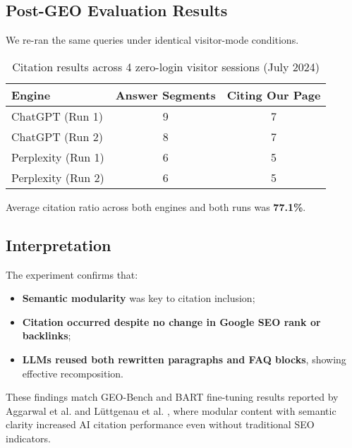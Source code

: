 \subsection{Post-GEO Evaluation Results}

We re-ran the same queries under identical visitor-mode conditions.

\begin{table}[h]
\centering
\begin{tabular}{|l|c|c|}
\hline
\textbf{Engine} & \textbf{Answer Segments} & \textbf{Citing Our Page} \\\hline
ChatGPT (Run 1) & 9 & 7 \\\hline
ChatGPT (Run 2) & 8 & 7 \\\hline
Perplexity (Run 1) & 6 & 5 \\\hline
Perplexity (Run 2) & 6 & 5 \\\hline
\end{tabular}
\caption{Citation results across 4 zero-login visitor sessions (July 2024)}
\end{table}

Average citation ratio across both engines and both runs was \textbf{77.1\%}.

\subsection{Interpretation}

The experiment confirms that:

\begin{itemize}
  \item \textbf{Semantic modularity} was key to citation inclusion;
  \item \textbf{Citation occurred despite no change in Google SEO rank or backlinks};
  \item \textbf{LLMs reused both rewritten paragraphs and FAQ blocks}, showing effective recomposition.
\end{itemize}

These findings match GEO-Bench and BART fine-tuning results reported by Aggarwal et al. \cite{aggarwal2024geo} and L\"uttgenau et al. \cite{luttgenau2025beyondseo}, where modular content with semantic clarity increased AI citation performance even without traditional SEO indicators.
